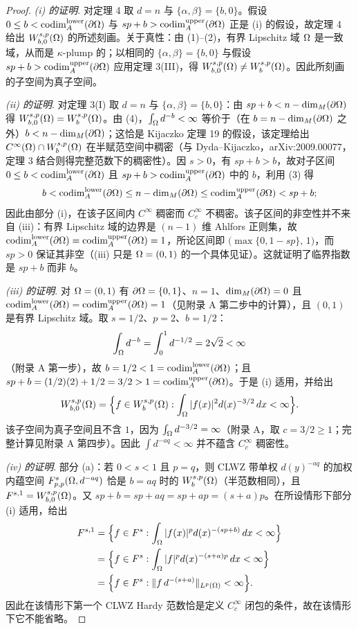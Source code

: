 \begin{proof}
\emph{(i) 的证明}. 对定理 4 取 $d=n$ 与 $\{\alpha,\beta\}=\{b,0\}$。假设 $0\le b<\operatorname{codim}_{A}^{\mathrm{lower}}(\partial\Omega)$ 与 $sp+b>\operatorname{codim}_{A}^{\mathrm{upper}}(\partial\Omega)$ 正是 (i) 的假设，故定理 4 给出 $W_{b,0}^{s,p}(\Omega)$ 的所述刻画。关于真性：由 (1)--(2)，有界 Lipschitz 域 $\Omega$ 是一致域，从而是 $\kappa$-plump 的；以相同的 $\{\alpha,\beta\}=\{b,0\}$ 与假设 $sp+b>\operatorname{codim}_{A}^{\mathrm{upper}}(\partial\Omega)$ 应用定理 3(III)，得 $W_{b,0}^{s,p}(\Omega)\neq W_b^{s,p}(\Omega)$。因此所刻画的子空间为真子空间。

\emph{(ii) 的证明}. 对定理 3(I) 取 $d=n$ 与 $\{\alpha,\beta\}=\{b,0\}$：由 $sp+b<n-\dim_{M}(\partial\Omega)$ 得 $W_{b,0}^{s,p}(\Omega)=W_b^{s,p}(\Omega)$。由 (4)，$\int_\Omega d^{-b}<\infty$ 等价于（在 $b=n-\dim_{M}(\partial\Omega)$ 之外）$b<n-\dim_{M}(\partial\Omega)$；这恰是 Kijaczko 定理 19 的假设，该定理给出 $C^\infty(\Omega)\cap W_b^{s,p}(\Omega)$ 在半赋范空间中稠密（与 Dyda--Kijaczko，arXiv:2009.00077，定理 3 结合则得完整范数下的稠密性）。因 $s>0$，有 $sp+b>b$，故对子区间 $0\le b<\operatorname{codim}_{A}^{\mathrm{lower}}(\partial\Omega)$ 且 $sp+b>\operatorname{codim}_{A}^{\mathrm{upper}}(\partial\Omega)$ 中的 $b$，利用 (3) 得
\[
  b<\operatorname{codim}_{A}^{\mathrm{lower}}(\partial\Omega)\le n-\dim_{M}(\partial\Omega)\le\operatorname{codim}_{A}^{\mathrm{upper}}(\partial\Omega)<sp+b;
\]
因此由部分 (i)，在该子区间内 $C^\infty$ 稠密而 $C_c^\infty$ 不稠密。该子区间的非空性并不来自 (iii)：有界 Lipschitz 域的边界是 $(n-1)$ 维 Ahlfors 正则集，故 $\operatorname{codim}_{A}^{\mathrm{lower}}(\partial\Omega)=\operatorname{codim}_{A}^{\mathrm{upper}}(\partial\Omega)=1$，所论区间即 $\big(\max\{0,1-sp\},\,1\big)$，而 $sp>0$ 保证其非空（(iii) 只是 $\Omega=(0,1)$ 的一个具体见证）。这就证明了临界指数是 $sp+b$ 而非 $b$。

\emph{(iii) 的证明}. 对 $\Omega=(0,1)$ 有 $\partial\Omega=\{0,1\}$、$n=1$、$\dim_{M}(\partial\Omega)=0$ 且 $\operatorname{codim}_{A}^{\mathrm{lower}}(\partial\Omega)=\operatorname{codim}_{A}^{\mathrm{upper}}(\partial\Omega)=1$（见附录 A 第二步中的计算），且 $(0,1)$ 是有界 Lipschitz 域。取 $s=1/2$、$p=2$、$b=1/2$：
\[
  \int_\Omega d^{-b}=\int_0^1 d^{-1/2}=2\sqrt2<\infty
\]
（附录 A 第一步），故 $b=1/2<1=\operatorname{codim}_{A}^{\mathrm{lower}}(\partial\Omega)$；且 $sp+b=(1/2)(2)+1/2=3/2>1=\operatorname{codim}_{A}^{\mathrm{upper}}(\partial\Omega)$。于是 (i) 适用，并给出
\[
  W_{b,0}^{s,p}(\Omega)=\Big\{f\in W_b^{s,p}(\Omega):\int_\Omega|f(x)|^2d(x)^{-3/2}\,dx<\infty\Big\}.
\]
该子空间为真子空间且不含 $1$，因为 $\int_\Omega d^{-3/2}=\infty$（附录 A，取 $c=3/2\ge1$；完整计算见附录 A 第四步）。因此 $\int d^{-aq}<\infty$ 并不蕴含 $C_c^\infty$ 稠密性。

\emph{(iv) 的证明}. 部分 (a)：若 $0<s<1$ 且 $p=q$，则 CLWZ 带单权 $d(y)^{-aq}$ 的加权内蕴空间 $F^s_{p,p}(\Omega,d^{-aq})$ 恰是 $b=aq$ 时的 $W_b^{s,p}(\Omega)$（半范数相同），且 $F^{s,1}=W_{b,0}^{s,p}(\Omega)$。又 $sp+b=sp+aq=sp+ap=(s+a)p$。在所设情形下部分 (i) 适用，给出
\begin{align*}
  F^{s,1}&=\Big\{f\in F^s:\int_\Omega|f(x)|^p d(x)^{-(sp+b)}\,dx<\infty\Big\}\\
  &=\Big\{f\in F^s:\int_\Omega|f|^p d(x)^{-(s+a)p}\,dx<\infty\Big\}\\
  &=\Big\{f\in F^s:\|f\,d^{-(s+a)}\|_{L^p(\Omega)}<\infty\Big\}.
\end{align*}
因此在该情形下第一个 CLWZ Hardy 范数恰是定义 $C_c^\infty$ 闭包的条件，故在该情形下它不能省略。


\end{proof}

